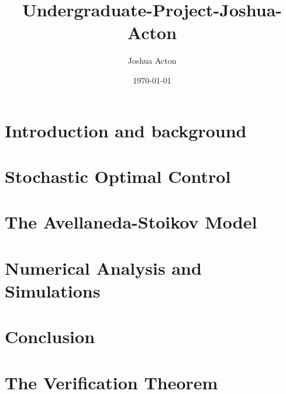 \documentclass[11pt,twoside]{report}
\title{Undergraduate-Project-Joshua-Acton}
\author{Joshua Acton}
\date{\today}
\theoremstyle{definition}
\theoremstyle{remark}
\begin{document}


%

%

%



\tableofcontents

\newpage
{}
\listoffigures

\chapter{Introduction and background}\label{chap:1}


\chapter{Stochastic Optimal Control}\label{chap:2}


\chapter{The Avellaneda-Stoikov Model}\label{chap:3}


%

\chapter{Numerical Analysis and Simulations}\label{chap:5}


\chapter{Conclusion}\label{chap:6}


\printbibliography[heading=bibintoc]

\appendix
\chapter{The Verification Theorem}\label{app:A}

\end{document}
